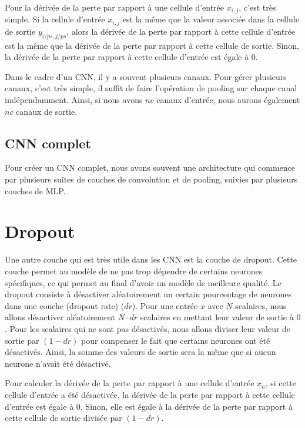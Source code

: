 \documentclass{article}
\begin{document}
\medskip

Pour la dérivée de la perte par rapport à une cellule d'entrée $x_{i,j}$, c'est très simple. Si la cellule d'entrée $x_{i,j}$ est la même que la valeur associée dans la cellule de sortie $y_{i/ps,j/ps}$, alors la dérivée de la perte par rapport à cette cellule d'entrée est la même que la dérivée de la perte par rapport à cette cellule de sortie. Sinon, la dérivée de la perte par rapport à cette cellule d'entrée est égale à 0.

\medskip

Dans le cadre d'un CNN, il y a souvent plusieurs canaux. Pour gérer plusieurs canaux, c'est très simple, il suffit de faire l'opération de pooling sur chaque canal indépendamment. Ainsi, si nous avons $nc$ canaux d'entrée, nous aurons également $nc$ canaux de sortie.

\subsection{CNN complet}

Pour créer un CNN complet, nous avons souvent une architecture qui commence par plusieurs suites de couches de convolution et de pooling, suivies par plusieurs couches de MLP. 

\section{Dropout}

Une autre couche qui est très utile dans les CNN est la couche de dropout. Cette couche permet au modèle de ne pas trop dépendre de certains neurones spécifiques, ce qui permet au final d'avoir un modèle de meilleure qualité. Le dropout consiste à désactiver aléatoirement un certain pourcentage de neurones dans une couche (dropout rate) ($dr$). Pour une entrée $x$ avec $N$ scalaires, nous allons désactiver aléatoirement $N \cdot dr$ scalaires en mettant leur valeur de sortie à $0$. Pour les scalaires qui ne sont pas désactivés, nous allons diviser leur valeur de sortie par $(1 - dr)$ pour compenser le fait que certains neurones ont été désactivés. Ainsi, la somme des valeurs de sortie sera la même que si aucun neurone n'avait été désactivé.

\medskip

Pour calculer la dérivée de la perte par rapport à une cellule d'entrée $x_n$, si cette cellule d'entrée a été désactivée, la dérivée de la perte par rapport à cette cellule d'entrée est égale à 0. Sinon, elle est égale à la dérivée de la perte par rapport à cette cellule de sortie divisée par $(1 - dr)$.
\end{document}
